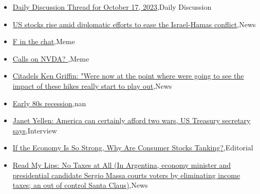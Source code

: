 \documentclass{article}%
\begin{document}
%
\begin{itemize}%
\item%
\href{https://reddit.com/r/wallstreetbets/comments/179usxk/daily\_discussion\_thread\_for\_october\_17\_2023/}{Daily Discussion Thread for October 17, 2023},Daily Discussion%
\item%
\href{https://reddit.com/r/wallstreetbets/comments/179sth2/us\_stocks\_rise\_amid\_diplomatic\_efforts\_to\_ease/}{US stocks rise amid diplomatic efforts to ease the Israel-Hamas conflict},News%
\item%
\href{https://reddit.com/r/wallstreetbets/comments/179pavd/f\_in\_the\_chat/}{F in the chat},Meme%
\item%
\href{https://reddit.com/r/wallstreetbets/comments/179ou8i/calls\_on\_nvda/}{Calls on NVDA? },Meme%
\item%
\href{https://reddit.com/r/StockMarket/comments/1798jbo/citadels\_ken\_griffin\_were\_now\_at\_the\_point\_where/}{Citadels Ken Griffin: "Were now at the point where were going to see the impact of these hikes really start to play out},News%
\item%
\href{https://reddit.com/r/Economics/comments/179fl6t/early\_80s\_recession/}{Early 80s recession},nan%
\item%
\href{https://reddit.com/r/Economics/comments/179aq1z/janet\_yellen\_america\_can\_certainly\_afford\_two/}{Janet Yellen: America can certainly afford two wars, US Treasury secretary says},Interview%
\item%
\href{https://reddit.com/r/Economics/comments/1799fmt/if\_the\_economy\_is\_so\_strong\_why\_are\_consumer/}{If the Economy Is So Strong, Why Are Consumer Stocks Tanking?},Editorial%
\item%
\href{https://reddit.com/r/Economics/comments/1797m24/read\_my\_lips\_no\_taxes\_at\_all\_in\_argentina\_economy/}{Read My Lips: No Taxes at All (In Argentina, economy minister and presidential candidate Sergio Massa courts voters by eliminating income taxes; an out of control Santa Claus)},News%
\end{itemize}%
\end{document}
